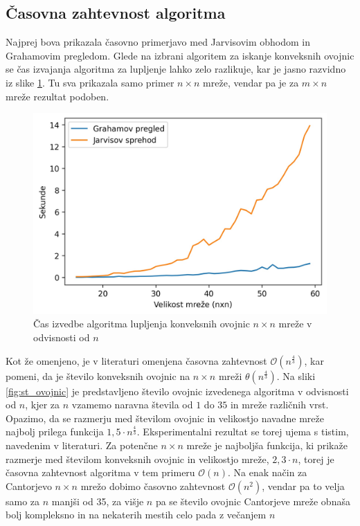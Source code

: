 \documentclass[a4paper]{article}
\begin{document}
\subsection{Časovna zahtevnost algoritma}
Najprej bova prikazala časovno primerjavo med Jarvisovim obhodom in Grahamovim pregledom. Glede na izbrani algoritem za iskanje konveksnih ovojnic se čas izvajanja algoritma za lupljenje
lahko zelo razlikuje, kar je jasno razvidno iz slike \ref{fig:cas}. Tu sva prikazala samo primer $n \times n$ mreže, vendar pa je za $m \times n$ mreže rezultat podoben.

\begin{figure}[!h]
	\centering
	\caption{Čas izvedbe algoritma lupljenja konveksnih ovojnic $n \times n$ mreže v odvisnosti od $n$}
	\label{fig:cas}
	\includegraphics[scale=0.6]{slike/cas.jpg}
\end{figure}

\newpage
Kot že omenjeno, je v literaturi omenjena časovna zahtevnost $\mathcal{O}(n ^ \frac{4}{3})$, kar pomeni, da je število konveksnih ovojnic na $n \times n$ mreži $\theta(n ^ \frac{4}{3})$.
Na sliki \ref{fig:st_ovojnic} je predstavljeno število ovojnic izvedenega algoritma v odvisnosti od $n$, kjer za $n$ vzamemo naravna števila od $1$ do $35$ in mreže različnih vrst. 
Opazimo, da se razmerju med številom ovojnic in velikostjo navadne mreže najbolj prilega funkcija $1,5 \cdot n ^ \frac{4}{3}$. Eksperimentalni rezultat se torej ujema s tistim, navedenim v 
literaturi. Za potenčne $n \times n$ mreže je najboljša funkcija, ki prikaže razmerje med številom konveksnih ovojnic in velikostjo mreže, $2,3 \cdot n$, torej je časovna zahtevnost algoritma
v tem primeru $\mathcal{O}(n)$. Na enak način za Cantorjevo $n \times n$ mrežo dobimo časovno zahtevnost $\mathcal{O}(n^2)$, vendar pa to velja samo za $n$ manjši od 35, za višje $n$ pa se
število ovojnic Cantorjeve mreže obnaša bolj kompleksno in na nekaterih mestih celo pada z večanjem $n$
\end{document}

